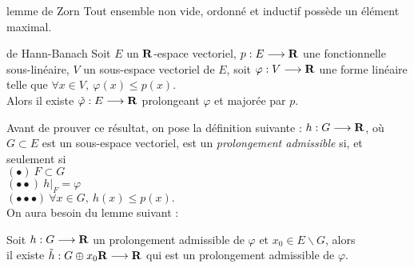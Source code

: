 \documentclass[a4paper,11pt, twoside]{article}
\begin{document}
\begin{thC}{lemme de Zorn}
  Tout ensemble non vide, ordonné et inductif possède un élément maximal.
\end{thC}


\begin{thC}{de Hann-Banach}
  Soit $E$ un $\mathbf R$-espace vectoriel, $p:E\longrightarrow \mathbf R$ une fonctionnelle sous-linéaire, $V$ un sous-espace vectoriel de $E$, soit $\varphi:V\longrightarrow\mathbf R$ une forme linéaire telle que $\forall x\in V,\ \varphi(x)\leqslant p(x).$\\

  Alors il existe $\tilde\varphi:E\longrightarrow\mathbf R$ prolongeant $\varphi$ et majorée par $p$.
\end{thC}


Avant de prouver ce résultat, on pose la définition suivante : $h:G\longrightarrow\mathbf R$, où $G\subset E$ est un sous-espace vectoriel, est un \emph{prolongement admissible} si, et seulement si\\
$(\bullet)\ F\subset G$\\
$(\bullet\bullet)\ h\big|_F=\varphi$\\
$(\bullet\bullet\bullet)\ \forall x\in G,\ h(x)\leqslant p(x).$\\


On aura besoin du lemme suivant : 


\begin{lemme}
  Soit $h:G\longrightarrow\mathbf R$ un prolongement admissible de $\varphi$ et $x_0\in E\backslash G$, alors\\

  il existe $\tilde h:G\oplus x_0\mathbf R\longrightarrow\mathbf R$ qui est un prolongement admissible de $\varphi$.
\end{lemme}
\end{document}
